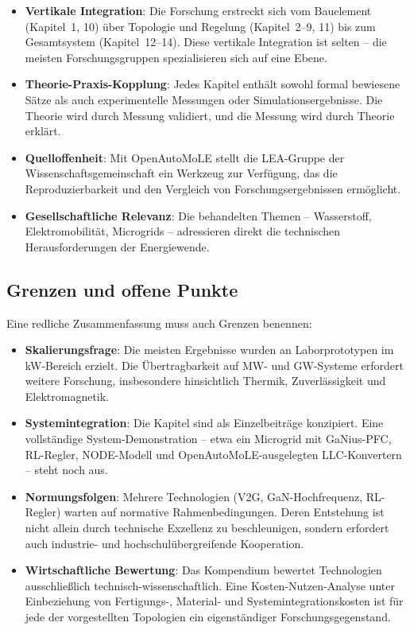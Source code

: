 ﻿\documentclass[a4paper,12pt,openany,oneside]{book}
\newcommand{\unterabschnitt}[1]{\subsection{#1}}
\theoremstyle{definition}
\begin{document}
\begin{itemize}
  \item \textbf{Vertikale Integration}: Die Forschung erstreckt sich vom Bauelement
    (Kapitel~1, 10) \"uber Topologie und Regelung (Kapitel~2--9, 11) bis zum
    Gesamtsystem (Kapitel~12--14). Diese vertikale Integration ist selten -- die meisten
    Forschungsgruppen spezialisieren sich auf eine Ebene.
  \item \textbf{Theorie-Praxis-Kopplung}: Jedes Kapitel enth\"alt sowohl formal bewiesene
    S\"atze als auch experimentelle Messungen oder Simulationsergebnisse. Die Theorie
    wird durch Messung validiert, und die Messung wird durch Theorie erkl\"art.
  \item \textbf{Quelloffenheit}: Mit OpenAutoMoLE stellt die LEA-Gruppe der
    Wissenschaftsgemeinschaft ein Werkzeug zur Verf\"ugung, das die Reproduzierbarkeit
    und den Vergleich von Forschungsergebnissen erm\"oglicht.
  \item \textbf{Gesellschaftliche Relevanz}: Die behandelten Themen -- Wasserstoff,
    Elektromobilit\"at, Microgrids -- adressieren direkt die technischen Herausforderungen
    der Energiewende.
\end{itemize}

\unterabschnitt{Grenzen und offene Punkte}

Eine redliche Zusammenfassung muss auch Grenzen benennen:

\begin{itemize}
  \item \textbf{Skalierungsfrage}: Die meisten Ergebnisse wurden an Laborprototypen im
    kW-Bereich erzielt. Die \"Ubertragbarkeit auf MW- und GW-Systeme erfordert weitere
    Forschung, insbesondere hinsichtlich Thermik, Zuverl\"assigkeit und Elektromagnetik.
  \item \textbf{Systemintegration}: Die Kapitel sind als Einzelbeitr\"age konzipiert.
    Eine vollst\"andige System-Demonstration -- etwa ein Microgrid mit GaNius-PFC,
    RL-Regler, NODE-Modell und OpenAutoMoLE-ausgelegten LLC-Konvertern -- steht noch aus.
  \item \textbf{Normungsfolgen}: Mehrere Technologien (V2G, GaN-Hochfrequenz, RL-Regler)
    warten auf normative Rahmenbedingungen. Deren Entstehung ist nicht allein durch
    technische Exzellenz zu beschleunigen, sondern erfordert auch industrie- und
    hochschul\"ubergreifende Kooperation.
  \item \textbf{Wirtschaftliche Bewertung}: Das Kompendium bewertet Technologien
    ausschlie\ss{}lich technisch-wissenschaftlich. Eine Kosten-Nutzen-Analyse unter
    Einbeziehung von Fertigungs-, Material- und Systemintegrationskosten ist f\"ur
    jede der vorgestellten Topologien ein eigenst\"andiger Forschungsgegenstand.
\end{itemize}
\end{document}
